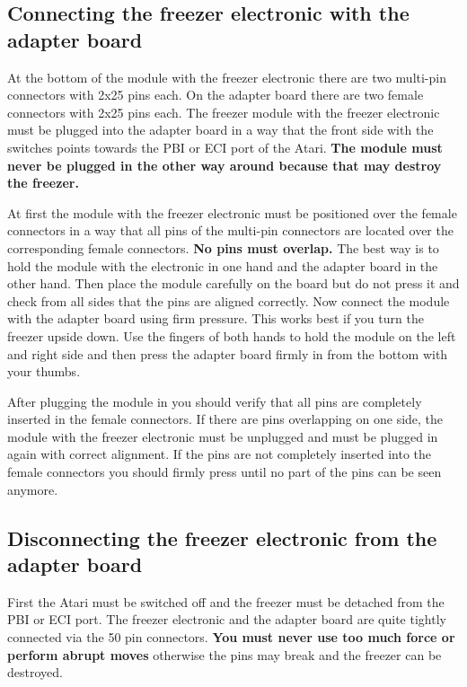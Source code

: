 \subsection{Connecting the freezer electronic with the adapter board}

At the bottom of the module with the freezer electronic there are two multi-pin
connectors with 2x25 pins each. On the adapter board there are two female
connectors with 2x25 pins each. The freezer module with the freezer electronic
must be plugged into the adapter board in a way that the front side with the
switches points towards the PBI or ECI port of the Atari.
\textbf{The module must never be plugged in the other way around because that
may destroy the freezer.}

At first the module with  the freezer electronic must be positioned over the
female connectors in a way that all pins of the multi-pin connectors are located
over the corresponding female connectors. \textbf{No pins must overlap.} The
best way is to hold the module with the electronic in one hand and the adapter
board in the other hand.
Then place the module carefully on the board but do not press it and check from
all sides that the pins are aligned correctly. Now connect the module with the
adapter board using firm pressure. This works best if you turn the freezer
upside down. Use the fingers of both hands to hold the module on the left and
right side and then press the adapter board firmly in from the bottom with your
thumbs.

After plugging the module in you should verify that all pins are completely
inserted in the female connectors. If there are pins overlapping on one side,
the module with the freezer electronic must be unplugged and must be plugged
in again with correct alignment. If the pins are not completely inserted into
the female connectors you should firmly press until no part of the pins can be
seen anymore.

\subsection{Disconnecting the freezer electronic from the adapter board}

First the Atari must be switched off and the freezer must be detached from the
PBI or ECI port. The freezer electronic and the adapter board are quite
tightly connected via the 50 pin connectors. \textbf{You must never use too much
force or perform abrupt moves} otherwise the pins may break and the freezer can
be destroyed.

